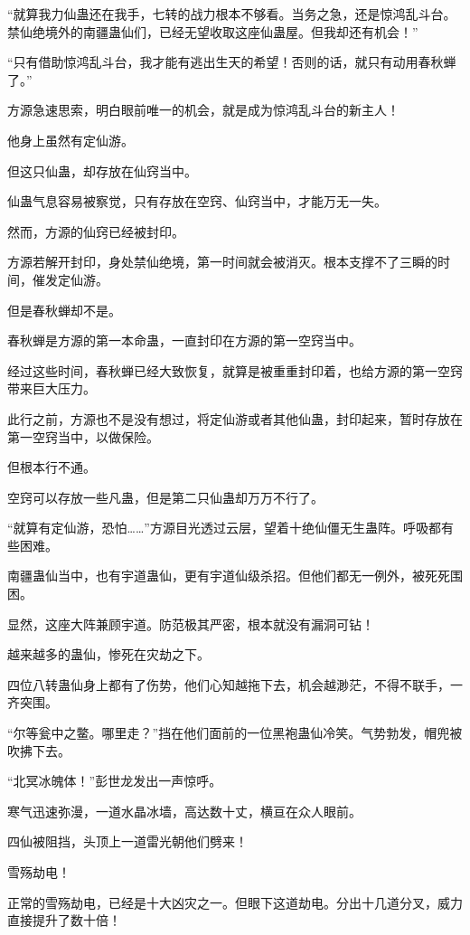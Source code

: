 
\begin{this_body}

“就算我力仙蛊还在我手，七转的战力根本不够看。当务之急，还是惊鸿乱斗台。禁仙绝境外的南疆蛊仙们，已经无望收取这座仙蛊屋。但我却还有机会！”

“只有借助惊鸿乱斗台，我才能有逃出生天的希望！否则的话，就只有动用春秋蝉了。”

方源急速思索，明白眼前唯一的机会，就是成为惊鸿乱斗台的新主人！

他身上虽然有定仙游。

但这只仙蛊，却存放在仙窍当中。

仙蛊气息容易被察觉，只有存放在空窍、仙窍当中，才能万无一失。

然而，方源的仙窍已经被封印。

方源若解开封印，身处禁仙绝境，第一时间就会被消灭。根本支撑不了三瞬的时间，催发定仙游。

但是春秋蝉却不是。

春秋蝉是方源的第一本命蛊，一直封印在方源的第一空窍当中。

经过这些时间，春秋蝉已经大致恢复，就算是被重重封印着，也给方源的第一空窍带来巨大压力。

此行之前，方源也不是没有想过，将定仙游或者其他仙蛊，封印起来，暂时存放在第一空窍当中，以做保险。

但根本行不通。

空窍可以存放一些凡蛊，但是第二只仙蛊却万万不行了。

“就算有定仙游，恐怕……”方源目光透过云层，望着十绝仙僵无生蛊阵。呼吸都有些困难。

南疆蛊仙当中，也有宇道蛊仙，更有宇道仙级杀招。但他们都无一例外，被死死围困。

显然，这座大阵兼顾宇道。防范极其严密，根本就没有漏洞可钻！

越来越多的蛊仙，惨死在灾劫之下。

四位八转蛊仙身上都有了伤势，他们心知越拖下去，机会越渺茫，不得不联手，一齐突围。

“尔等瓮中之鳖。哪里走？”挡在他们面前的一位黑袍蛊仙冷笑。气势勃发，帽兜被吹拂下去。

“北冥冰魄体！”彭世龙发出一声惊呼。

寒气迅速弥漫，一道水晶冰墙，高达数十丈，横亘在众人眼前。

四仙被阻挡，头顶上一道雷光朝他们劈来！

雪殇劫电！

正常的雪殇劫电，已经是十大凶灾之一。但眼下这道劫电。分出十几道分叉，威力直接提升了数十倍！


\end{this_body}
